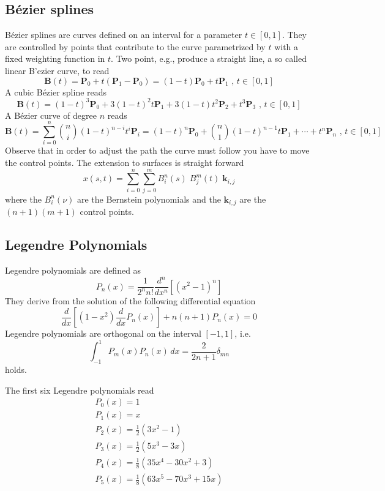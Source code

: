 \subsection{B\'ezier splines}
B\'ezier splines are curves defined on an interval for a parameter $t\in [0,1]$.
They are controlled by points that contribute to the curve parametrized by $t$
with a fixed weighting function in $t$. Two point, e.g., produce a straight
line, a so called linear B'ezier curve, to read
\[     \mathbf{B}(t)=\mathbf{P}_0 + t(\mathbf{P}_1-\mathbf{P}_0)=(1-t)\mathbf{P}_0 + t\mathbf{P}_1 \mbox{ , } t \in [0,1] \]
A cubic B\'ezier spline reads
\[     \mathbf{B}(t)=(1-t)^3\mathbf{P}_0+3(1-t)^2t\mathbf{P}_1+3(1-t)t^2\mathbf{P}_2+t^3\mathbf{P}_3 \mbox{ , } t \in [0,1]\]
A B\'ezier curve of degree $n$ reads
\[ \mathbf{B}(t)=\sum_{i=0}^n \binom{n}{i}(1-t)^{n-i}t^i\mathbf{P}_i =(1-t)^n\mathbf{P}_0+\binom{n}{1}(1-t)^{n-1}t\mathbf{P}_1+\cdots+t^n\mathbf{P}_n \mbox{ , } t \in [0,1]\]
Observe that in order to adjust the path the curve must follow you have to move
the control points. The extension to surfaces is straight forward
\[ x(s,t)=\sum_{i=0}^n \sum_{j=0}^m B_i^n(s) \; B_j^m(t) \; \mathbf{k}_{i,j}\]
where the $B_i^n(\nu)$ are the Bernstein polynomials and the $\mathbf{k}_{i,j}$ are the $(n+1)(m+1)$ control points.
\subsection{Legendre Polynomials}
Legendre polynomials are defined as
\begin{equation}
	    P_n(x) = \frac{1}{2^n n!}\frac{d^n}{dx^n } \left[ (x^2 -1)^n \right]
	\label{eq:legendre}
\end{equation}
They derive from the solution of the following differential equation
\[\frac{d}{dx} \left[ (1-x^2)\frac{d}{dx} P_n(x) \right] + n(n+1)P_n(x) = 0\]
Legendre polynomials are orthogonal on the interval $[-1,1]$, i.e.
\[     \int_{-1}^{1} P_m(x) P_n(x)\,dx = \frac{2}{2n + 1} \delta_{mn} \]
holds.

The first six Legendre polynomials read
\begin{eqnarray*}
 	P_0(x)=1\\
	P_1(x)=x\\
	P_2(x)=\frac{1}{2} (3x^2-1) \\
	P_3(x)=\frac{1}{2} (5x^3-3x) \\
	P_4(x)=\frac{1}{8} (35x^4-30x^2+3)\\
	P_5(x)=\frac{1}{8} (63x^5-70x^3+15x)
\end{eqnarray*}
